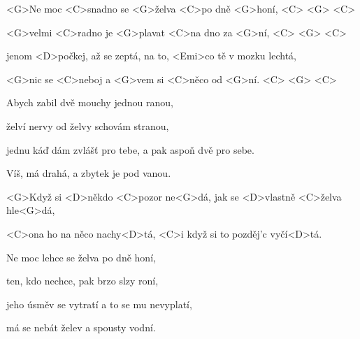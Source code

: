 

\zs
<G>Ne moc <C>snadno se <G>želva <C>po dně <G>honí, <C> <G> <C>

<G>velmi <C>radno je <G>plavat <C>na dno za <G>ní, <C> <G> <C>

jenom <D>počkej, až se zeptá, na to, <Emi>co tě v mozku lechtá,

<G>nic se <C>neboj a <G>vem si <C>něco od <G>ní. <C> <G> <C>
\ks

\zs
Abych zabil dvě mouchy jednou ranou,

želví nervy od želvy schovám stranou,

jednu káď dám zvlášť pro tebe, a pak aspoň dvě pro sebe.

Víš, má drahá, a zbytek je pod vanou.
\ks

\zr
<G>Když si <D>někdo <C>pozor ne<G>dá, jak se <D>vlastně <C>želva hle<G>dá,

<C>ona ho na něco nachy<D>tá, <C>i když si to pozděj’c 
vyčí<D>tá.
\kr

\zs
Ne moc lehce se želva po dně honí,

ten, kdo nechce, pak brzo slzy roní,

jeho úsměv se vytratí a to se mu nevyplatí,

má se nebát želev a spousty vodní.
\ks

\zr \kr

\kp
